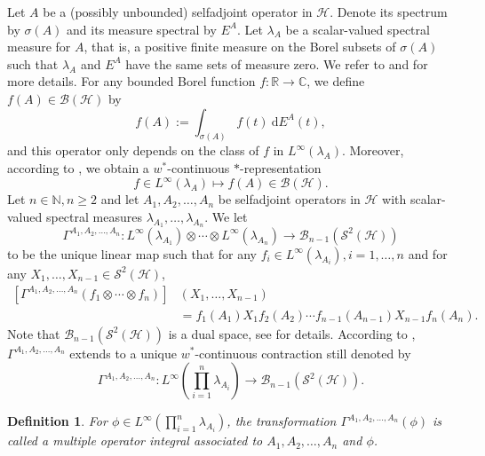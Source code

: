 \documentclass[12pt]{amsart}
\newtheorem{definition}[theorem]{Definition}
\theoremstyle{remark}
\newcommand{\N}{\mbox{${\mathbb N}$}}
\begin{document}
Let $A$ be a (possibly unbounded) selfadjoint operator in $\mathcal{H}$. Denote its spectrum by $\sigma(A)$ and its measure spectral by $E^A$. Let $\lambda_A$ be a scalar-valued spectral measure for $A$, that is, a positive finite measure on the Borel subsets of $\sigma(A)$ such that $\lambda_A$ and $E^A$ have the same sets of measure zero. We refer to \cite[Section 15]{Conway} and \cite[Section 2.1]{CLS} for more details. For any bounded Borel function $f : \mathbb{R} \to \mathbb{C}$, we define $f(A) \in \mathcal{B}(\mathcal{H})$ by
$$
f(A):=\int_{\sigma(A)} f(t) \ \text{d}E^A(t),
$$
and this operator only depends on the class of $f$ in $L^{\infty}(\lambda_A)$. Moreover, according to \cite[Theorem 15.10]{Conway}, we obtain a $w^*$-continuous $*$-representation
$$
f \in L^{\infty}(\lambda_A) \mapsto f(A) \in \mathcal{B}(\mathcal{H}).
$$
Let $n\in\N, n\geq 2$ and let $A_1, A_2, \ldots, A_n$ be selfadjoint operators in $\mathcal{H}$ with scalar-valued spectral measures $\lambda_{A_1}, \ldots, \lambda_{A_n}$. We let
\begin{equation*}
\Gamma^{A_1,A_2, \ldots, A_n} : L^{\infty}(\lambda_{A_1}) \otimes \cdots \otimes L^{\infty}(\lambda_{A_n}) \rightarrow \mathcal{B}_{n-1}(\mathcal{S}^2(\mathcal{H}))
\end{equation*}
to be the unique linear map such that for any $f_i \in L^{\infty}(\lambda_{A_i}), i=1, \ldots, n$ and for any $X_1, \ldots, X_{n-1} \in \mathcal{S}^2(\mathcal{H})$,
\begin{align}\label{MOItensor}
\left[\Gamma^{A_1,A_2, \ldots, A_n}(f_1\otimes\cdots\otimes f_n)\right]
& (X_1,\ldots, X_{n-1})\\ \nonumber
& =f_1(A_1)X_1f_2(A_2) \cdots f_{n-1}(A_{n-1})X_{n-1}f_n(A_n).
\end{align}
Note that $\mathcal{B}_{n-1}(\mathcal{S}^2(\mathcal{H}))$ is a dual space, see \cite[Section 3.1]{CLS} for details. According to \cite[Theorem 5 and Proposition 6]{CLS}, $\Gamma^{A_1,A_2, \ldots, A_n}$ extends to a unique $w^*$-continuous contraction still denoted by
$$
\Gamma^{A_1,A_2, \ldots, A_n} : L^{\infty}\left(\prod_{i=1}^n
\lambda_{A_i}\right) \longrightarrow
\mathcal{B}_{n-1}(\mathcal{S}^2(\mathcal{H})).
$$

\begin{definition}
For $\phi \in L^{\infty}\left(\prod_{i=1}^n\lambda_{A_i}\right)$, the transformation $\Gamma^{A_1,A_2, \ldots, A_n}(\phi)$ is called a multiple operator integral associated to $A_1, A_2, \ldots, A_n$ and $\phi$.
\end{definition}
\end{document}
